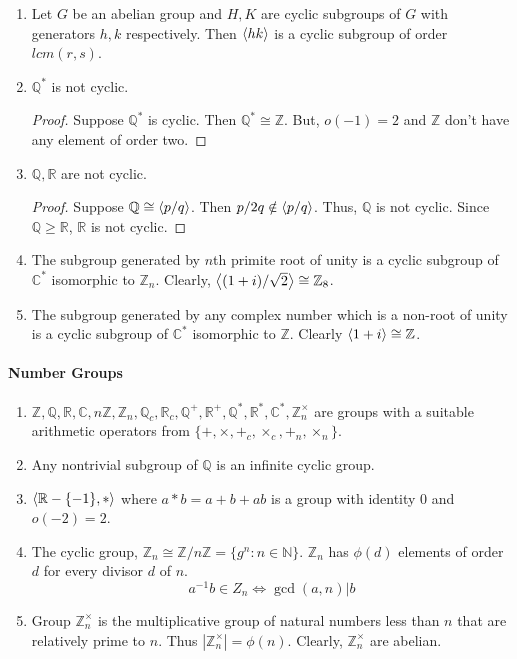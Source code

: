 \begin{enumerate}
	\item Let $G$ be an abelian group and $H,K$ are cyclic subgroups of $G$ with generators $h,k$ respectively. Then $\left\langle hk \right\rangle$ is a cyclic subgroup of order $lcm(r,s)$.
	\item $\mathbb{Q}^\ast$ is not cyclic.
	\begin{proof}
		Suppose $\mathbb{Q}^\ast$ is cyclic.
		Then $\mathbb{Q}^\ast \cong \mathbb{Z}$.
		But, $o(-1) = 2$ and $\mathbb{Z}$ don't have any element of order two.
	\end{proof}
	\item $\mathbb{Q},\mathbb{R}$ are not cyclic.
	\begin{proof}
		Suppose $\mathbb{Q} \cong \left\langle p/q \right\rangle$. Then $p/2q \notin \left\langle p/q \right\rangle$.
		Thus, $\mathbb{Q}$ is not cyclic.
		Since $\mathbb{Q} \ge \mathbb{R}$, $\mathbb{R}$ is not cyclic.
	\end{proof}
	\item The subgroup generated by $n$th primite root of unity is a cyclic subgroup of $\mathbb{C}^\ast$ isomorphic to $\mathbb{Z}_n$.
		Clearly, $\left\langle (1+i)/\sqrt{2} \right\rangle \cong \mathbb{Z}_8$.
	\item The subgroup generated by any complex number which is a non-root of unity is a cyclic subgroup of $\mathbb{C}^\ast$ isomorphic to $\mathbb{Z}$.
		Clearly $\left\langle 1+i \right\rangle \cong \mathbb{Z}$.
\end{enumerate}

\paragraph{Number Groups}
\begin{enumerate}
	\item $\mathbb{Z},\mathbb{Q},\mathbb{R},\mathbb{C}, n\mathbb{Z}, \mathbb{Z}_n, \mathbb{Q}_c, \mathbb{R}_c, \mathbb{Q}^+, \mathbb{R}^+, \mathbb{Q}^\ast, \mathbb{R}^\ast, \mathbb{C}^\ast, \mathbb{Z}_n^\times$ are groups with a suitable arithmetic operators from $\{ +,\times,+_c,\times_c,+_n,\times_n\}$.
	\item Any nontrivial subgroup of $\mathbb{Q}$ is an infinite cyclic group.
	\item $\left\langle \mathbb{R}-\{-1\},\ast \right\rangle$ where $a \ast b = a+b+ab$ is a group with identity $0$ and $o(-2)=2$.
	\item The cyclic group, $\mathbb{Z}_n \cong \mathbb{Z}/n\mathbb{Z} = \{ g^n : n \in \mathbb{N}\}$. $\mathbb{Z}_n$ has $\phi(d)$ elements of order $d$ for every divisor $d$ of $n$.
	$$a^{-1}b \in Z_n \iff \gcd(a,n)|b$$
	\item Group $\mathbb{Z}_n^\times$ is the multiplicative group of natural numbers less than $n$ that are relatively prime to $n$. Thus $|\mathbb{Z}_n^\times| = \phi(n)$.
	Clearly, $\mathbb{Z}_n^\times$ are abelian.
\end{enumerate}

